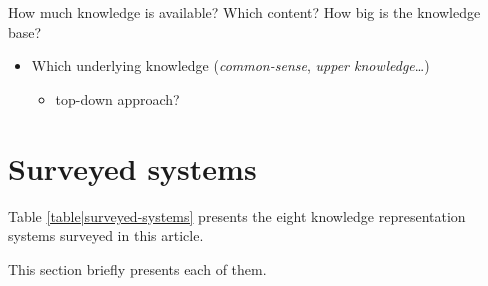 \documentclass[a4paper, twocolumn]{article}
\begin{document}
How much knowledge is available? Which content? How big is the knowledge base?

\begin{itemize}
	\item  Which underlying knowledge (\emph{common-sense}, \emph{upper knowledge}\ldots{})
	\begin{itemize}
		\item  top-down approach?
	\end{itemize}

\end{itemize}



\section{Surveyed systems}
\label{sect|surveyed-systems}

Table \ref{table|surveyed-systems} presents the eight knowledge representation
systems surveyed in this article.

This section briefly presents each of them.
\end{document}
